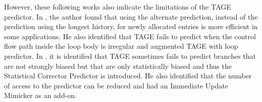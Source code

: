 \documentclass[screen,nonacm,sigconf]{acmart}
\begin{document}
However, these following works also indicate the limitations of the TAGE predictor.
In \cite{Seznec07jilp}, the author found that using the alternate prediction, instead of the prediction using the longest history, for newly allocated entries is more efficient in some applications.
He also identified that TAGE fails to predict when the control flow path inside the loop body is irregular and augmented TAGE with loop predictor.
In \cite{Seznec11hal}, it is identified that TAGE sometimes fails to predict branches that are not strongly biased but that are only statistically biased and thus the Statistical Corrector Predictor is introduced.
He also identified that the number of access to the predictor can be reduced and had an Immediate Update Mimicker as an add-on.






\newpage

\appendix
\end{document}
